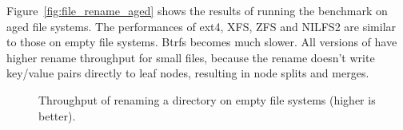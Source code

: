 Figure~\ref{fig:file_rename_aged} shows the results of running the benchmark
on aged file systems.
The performances of ext4, XFS, ZFS and NILFS2 are similar to those on empty
file systems.
Btrfs becomes much slower.
All versions of \betrfs have higher rename throughput for small files, because
the rename doesn't write key/value pairs directly to leaf nodes,
resulting in node splits and merges.

\begin{figure}[t]
    \centering
    \caption[Directory rename benchmark on empty file systems]{\label{fig:dir_rename_empty}
         Throughput of renaming a directory on empty file systems (higher is better).}
\end{figure}

